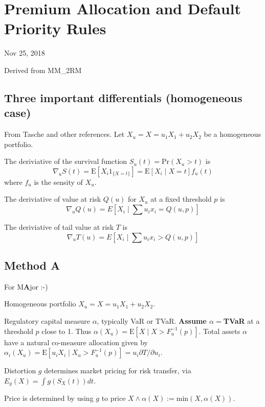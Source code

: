\hypertarget{premium-allocation-and-default-priority-rules}{%
\section{Premium Allocation and Default Priority
Rules}\label{premium-allocation-and-default-priority-rules}}

Nov 25, 2018

Derived from MM\_2RM

\hypertarget{three-important-differentials-homogeneous-case}{%
\subsection{Three important differentials (homogeneous
case)}\label{three-important-differentials-homogeneous-case}}

From Tasche and other references. Let \(X_u=X=u_1X_1 + u_2X_2\) be a
homogeneous portfolio.

The deriviative of the survival function \(S_u(t)=\text{Pr}(X_u>t)\) is
\[
\nabla_u S(t) = \text{E}[X_i 1_{\{X=t\}}] = \text{E}[X_i \mid X=t] f_u(t)
\] where \(f_u\) is the sensity of \(X_u\).

The deriviative of value at risk \(Q(u)\) for \(X_u\) at a fixed
threshold \(p\) is \[
\nabla_u Q(u) = E[X_i\mid \sum u_ix_i = Q(u,p)]
\]

The deriviative of tail value at risk \(T\) is \[
\nabla_u T(u) = E[X_i\mid \sum u_ix_i>Q(u,p)]
\]

\hypertarget{method-a}{%
\subsection{Method A}\label{method-a}}

For M\textbf{A}jor :-)

Homogeneous portfolio \(X_u=X=u_1X_1 + u_2X_2\).

Regulatory capital measure \(\alpha\), typically VaR or TVaR.
\textbf{Assume \(\alpha=\)TVaR} at a threshold \(p\) close to 1. Thus
\(\alpha(X_u) = \text{E}[X\mid X > F_u^{-1}(p)]\). Total assets
\(\alpha\) have a natural co-measure allocation given by
\(\alpha_i(X_u)= \text{E}[u_iX_i \mid X_u > F_u^{-1}(p)] = u_i \partial T/\partial u_i\).

Distortion \(g\) determines market pricing for risk transfer, via
\(E_g(X) = \int g(S_X(t))dt\).

Price is determined by using \(g\) to price
\(X\wedge \alpha(X):=\text{min}(X, \alpha(X))\).

